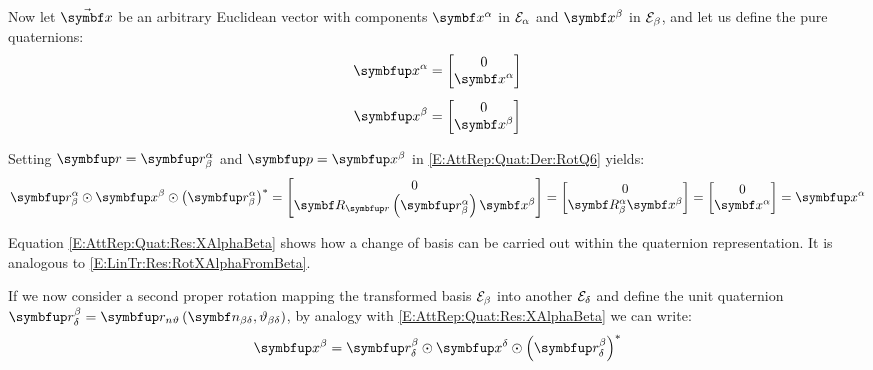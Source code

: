 Now let $\vabs{x}$ be an arbitrary Euclidean vector with components $\vprj{x}{\alpha}$ in $\basis[\alpha]$ and $\vprj{x}{\beta}$ in $\basis[\beta]$, and let us define the pure quaternions:
\begin{subequations}
	\begin{gather}
	\qprj{x}{\alpha} = \qcol{0}{\vprj{x}{\alpha}} \label{E:AttRep:Quat:Def:XAlpha} \\[1ex]
	\qprj{x}{\beta} = \qcol{0}{\vprj{x}{\beta}}\label{E:AttRep:Quat:Def:XBeta} 
	\end{gather}
\end{subequations}

Setting $\quat{\rotq}=\RotQ{\alpha}{\beta}$ and $\quat{p}=\qprj{x}{\beta}$ in \eqref{E:AttRep:Quat:Der:RotQ6} yields: 
\begin{equation} \label{E:AttRep:Quat:Res:XAlphaBeta}
\RotQ{\alpha}{\beta} \qprod \qprj{x}{\beta} \qprod \qconp{\RotQ{\alpha}{\beta}} = \qcol{0} {\RotMQuat{\RotQ{\alpha}{\beta}} \vprj{x}{\beta}} = \qcol{0} {\RotM{\alpha}{\beta} \vprj{x}{\beta}} = \qcol{0} {\vprj{x}{\alpha}} = \qprj{x}{\alpha}
\end{equation}

Equation \eqref{E:AttRep:Quat:Res:XAlphaBeta} shows how a change of basis can be carried out within the quaternion representation. It is analogous to \eqref{E:LinTr:Res:RotXAlphaFromBeta}.

If we now consider a second proper rotation mapping the transformed basis $\basis[\beta]$ into another $\basis[\delta]$ and define the unit quaternion $\RotQ{\beta}{\delta}=\RotQAxAng{\vrel{\rotax}{\beta}{\delta}}{\rel{\rotang}{\beta}{\delta}}$, by analogy with \eqref{E:AttRep:Quat:Res:XAlphaBeta} we can write:
\begin{equation} \label{E:AttRep:Quat:Res:XBetaDelta}
\qprj{x}{\beta}   = \RotQ{\beta}{\delta} \qprod \qprj{x}{\delta} \qprod \qconp{\RotQ{\beta}{\delta}}
\end{equation}

